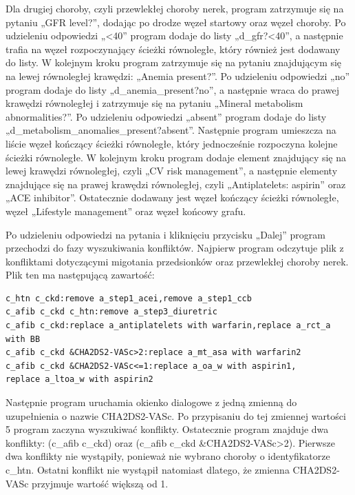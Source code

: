 Dla drugiej choroby, czyli przewlekłej choroby nerek, program zatrzymuje się na pytaniu „GFR level?”, dodając po drodze węzeł startowy oraz węzeł choroby. Po udzieleniu odpowiedzi „<40” program dodaje do listy „d\_gfr?<40”, a następnie trafia na węzeł rozpoczynający ścieżki równoległe, który również jest dodawany do listy. W kolejnym kroku program zatrzymuje się na  pytaniu znajdującym się na lewej równoległej krawędzi: „Anemia present?”. Po udzieleniu odpowiedzi „no” program dodaje do listy „d\_anemia\_present?no”, a następnie wraca do prawej krawędzi równoległej i zatrzymuje się na pytaniu „Mineral metabolism abnormalities?”. Po udzieleniu odpowiedzi „absent” program dodaje do listy „d\_metabolism\_anomalies\_present?absent”. Następnie program umieszcza na liście węzeł kończący ścieżki równoległe, który jednocześnie rozpoczyna kolejne ścieżki równoległe. W kolejnym kroku program dodaje element znajdujący się na lewej krawędzi równoległej, czyli „CV risk management”, a następnie elementy znajdujące się na prawej krawędzi równoległej, czyli „Antiplatelets: aspirin” oraz „ACE inhibitor”. Ostatecznie dodawany jest węzeł kończący ścieżki równoległe, węzeł „Lifestyle management” oraz węzeł końcowy grafu.

Po udzieleniu odpowiedzi na pytania i kliknięciu przycisku „Dalej” program przechodzi do fazy wyszukiwania konfliktów. Najpierw program odczytuje plik z konfliktami dotyczącymi migotania przedsionków oraz przewlekłej choroby nerek. Plik ten ma następującą zawartość:
\begin{verbatim}
c_htn c_ckd:remove a_step1_acei,remove a_step1_ccb
c_afib c_ckd c_htn:remove a_step3_diuretric
c_afib c_ckd:replace a_antiplatelets with warfarin,replace a_rct_a with BB
c_afib c_ckd &CHA2DS2-VASc>2:replace a_mt_asa with warfarin2
c_afib c_ckd &CHA2DS2-VASc<=1:replace a_oa_w with aspirin1,
replace a_ltoa_w with aspirin2
\end{verbatim}
Następnie program uruchamia okienko dialogowe z jedną zmienną do uzupełnienia o nazwie CHA2\-DS2-VASc. Po przypisaniu do tej zmiennej wartości 5 program zaczyna wyszukiwać konflikty. Ostatecznie program znajduje dwa konflikty: (c\_afib c\_ckd) oraz (c\_afib c\_ckd \&CHA2DS2-VASc>2). Pierwsze dwa konflikty nie wystąpiły, ponieważ nie wybrano choroby o identyfikatorze c\_htn. Ostatni konflikt nie wystąpił natomiast dlatego, że zmienna CHA2DS2-VASc przyjmuje wartość większą od 1.


